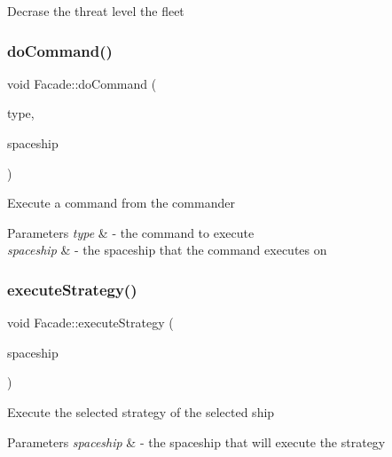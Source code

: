 Decrase the threat level the fleet \mbox{\label{classFacade_a4c49632c6a0cfc98ed5ffa5d4fe7575b}} 
\subsubsection{\texorpdfstring{do\+Command()}{doCommand()}}
{\footnotesize\ttfamily void Facade\+::do\+Command (\begin{DoxyParamCaption}\item[{string}]{type,  }\item[{\hyperlink{classSpaceship}{Spaceship} $\ast$}]{spaceship }\end{DoxyParamCaption})}

Execute a command from the commander 
\begin{DoxyParams}{Parameters}
{\em type} & -\/ the command to execute \\
\hline
{\em spaceship} & -\/ the spaceship that the command executes on \\
\hline
\end{DoxyParams}
\mbox{\label{classFacade_a46b8ea3a69b017548c7eaf207f674976}} 
\subsubsection{\texorpdfstring{execute\+Strategy()}{executeStrategy()}}
{\footnotesize\ttfamily void Facade\+::execute\+Strategy (\begin{DoxyParamCaption}\item[{\hyperlink{classSpaceship}{Spaceship} $\ast$}]{spaceship }\end{DoxyParamCaption})}

Execute the selected strategy of the selected ship 
\begin{DoxyParams}{Parameters}
{\em spaceship} & -\/ the spaceship that will execute the strategy \\
\hline
\end{DoxyParams}
\mbox{\label{classFacade_ac12365765267ad5cc81b4eae205cf989}} 
